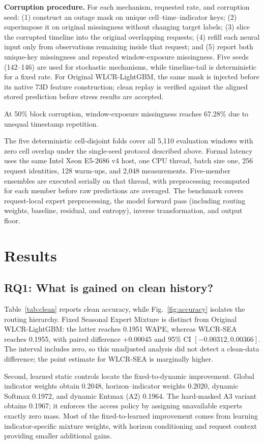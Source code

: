 \documentclass[10pt,conference,letterpaper]{IEEEtran}
\newcommand{\method}{WLCR-SEA}
\newcommand{\originalmethod}{Original WLCR-LightGBM}
\newcommand{\fixedmixture}{Fixed Seasonal Expert Mixture}
\begin{document}
\noindent\textbf{Corruption procedure.} For each mechanism, requested rate, and corruption seed: (1) construct an outage mask on unique cell--time--indicator keys; (2) superimpose it on original missingness without changing target labels; (3) slice the corrupted timeline into the original overlapping requests; (4) refill each neural input only from observations remaining inside that request; and (5) report both unique-key missingness and repeated window-exposure missingness. Five seeds (142--146) are used for stochastic mechanisms, while timeline-tail is deterministic for a fixed rate. For \originalmethod{}, the same mask is injected before its native 73D feature construction; clean replay is verified against the aligned stored prediction before stress results are accepted.

At 50\% block corruption, window-exposure missingness reaches 67.28\% due to unequal timestamp repetition.

The five deterministic cell-disjoint folds cover all 5,110 evaluation windows with zero cell overlap under the single-seed protocol described above. Formal latency uses the same Intel Xeon E5-2686 v4 host, one CPU thread, batch size one, 256 request identities, 128 warm-ups, and 2,048 measurements. Five-member ensembles are executed serially on that thread, with preprocessing recomputed for each member before raw predictions are averaged. The benchmark covers request-local expert preprocessing, the model forward pass (including routing weights, baseline, residual, and entropy), inverse transformation, and output floor.

\section{Results}
\subsection{RQ1: What is gained on clean history?}
Table~\ref{tab:clean} reports clean accuracy, while Fig.~\ref{fig:accuracy} isolates the routing hierarchy. \fixedmixture{} is distinct from \originalmethod{}: the latter reaches 0.1951 WAPE, whereas \method{} reaches 0.1955, with paired difference $+0.00045$ and 95\% CI $[-0.00312,0.00366]$. The interval includes zero, so this unadjusted analysis did not detect a clean-data difference; the point estimate for \method{} is marginally higher.

Second, learned static controls locate the fixed-to-dynamic improvement. Global indicator weights obtain 0.2048, horizon--indicator weights 0.2020, dynamic Softmax 0.1972, and dynamic Entmax (A2) 0.1964. The hard-masked A3 variant obtains 0.1967; it enforces the access policy by assigning unavailable experts exactly zero mass. Most of the fixed-to-learned improvement comes from learning indicator-specific mixture weights, with horizon conditioning and request context providing smaller additional gains.
\end{document}
